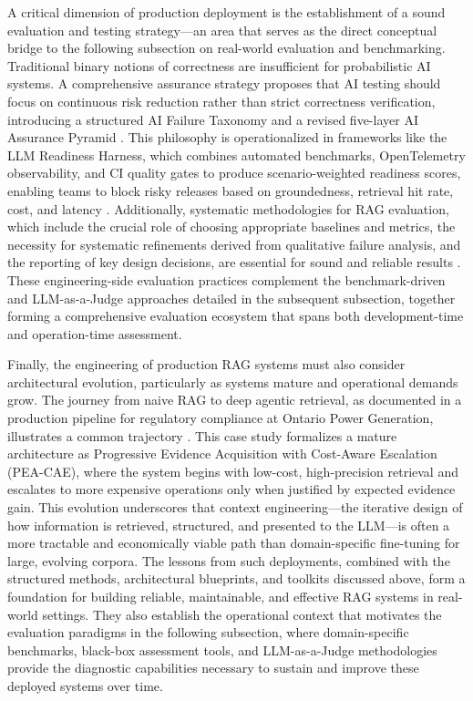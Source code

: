 \documentclass[11pt]{article}
\begin{document}
A critical dimension of production deployment is the establishment of a sound evaluation and testing strategy---an area that serves as the direct conceptual bridge to the following subsection on real-world evaluation and benchmarking. Traditional binary notions of correctness are insufficient for probabilistic AI systems. A comprehensive assurance strategy proposes that AI testing should focus on continuous risk reduction rather than strict correctness verification, introducing a structured AI Failure Taxonomy and a revised five-layer AI Assurance Pyramid \cite{ref578}. This philosophy is operationalized in frameworks like the LLM Readiness Harness, which combines automated benchmarks, OpenTelemetry observability, and CI quality gates to produce scenario-weighted readiness scores, enabling teams to block risky releases based on groundedness, retrieval hit rate, cost, and latency \cite{ref579}. Additionally, systematic methodologies for RAG evaluation, which include the crucial role of choosing appropriate baselines and metrics, the necessity for systematic refinements derived from qualitative failure analysis, and the reporting of key design decisions, are essential for sound and reliable results \cite{ref580}. These engineering-side evaluation practices complement the benchmark-driven and LLM-as-a-Judge approaches detailed in the subsequent subsection, together forming a comprehensive evaluation ecosystem that spans both development-time and operation-time assessment.

Finally, the engineering of production RAG systems must also consider architectural evolution, particularly as systems mature and operational demands grow. The journey from naive RAG to deep agentic retrieval, as documented in a production pipeline for regulatory compliance at Ontario Power Generation, illustrates a common trajectory \cite{ref24}. This case study formalizes a mature architecture as Progressive Evidence Acquisition with Cost-Aware Escalation (PEA-CAE), where the system begins with low-cost, high-precision retrieval and escalates to more expensive operations only when justified by expected evidence gain. This evolution underscores that context engineering---the iterative design of how information is retrieved, structured, and presented to the LLM---is often a more tractable and economically viable path than domain-specific fine-tuning for large, evolving corpora. The lessons from such deployments, combined with the structured methods, architectural blueprints, and toolkits discussed above, form a foundation for building reliable, maintainable, and effective RAG systems in real-world settings. They also establish the operational context that motivates the evaluation paradigms in the following subsection, where domain-specific benchmarks, black-box assessment tools, and LLM-as-a-Judge methodologies provide the diagnostic capabilities necessary to sustain and improve these deployed systems over time.
\end{document}
